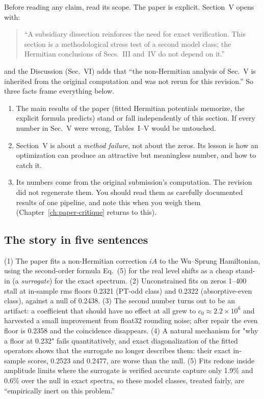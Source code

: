 Before reading any claim, read its scope. The paper is explicit. Section~V opens with:

\begin{quote}
``A subsidiary dissection reinforces the need for exact verification. This section is a methodological stress test of a second model class; the Hermitian conclusions of Secs.~III and~IV do not depend on it.''
\end{quote}

and the Discussion (Sec.~VI) adds that ``the non-Hermitian analysis of Sec.~V is inherited from the original computation and was not rerun for this revision.'' So three facts frame everything below.

\begin{enumerate}
\item The main results of the paper (fitted Hermitian potentials memorize, the explicit formula predicts) stand or fall independently of this section. If every number in Sec.~V were wrong, Tables~I--V would be untouched.
\item Section~V is about a \emph{method failure}, not about the zeros. Its lesson is how an optimization can produce an attractive but meaningless number, and how to catch it.
\item Its numbers come from the original submission's computation. The revision did not regenerate them. You should read them as carefully documented results of one pipeline, and note this when you weigh them (Chapter~\ref{ch:paper-critique} returns to this).
\end{enumerate}

\subsection{The story in five sentences}

(1) The paper fits a non-Hermitian correction $iA$ to the Wu--Sprung Hamiltonian, using the second-order formula Eq.~(5) for the real level shifts as a cheap stand-in (a \emph{surrogate}) for the exact spectrum. (2) Unconstrained fits on zeros 1--400 stall at in-sample rms floors 0.2321 (PT-odd class) and 0.2322 (absorptive-even class), against a null of 0.2438. (3) The second number turns out to be an artifact: a coefficient that should have no effect at all grew to $c_0\approx2.2\times10^6$ and harvested a small improvement from float32 rounding noise; after repair the even floor is 0.2358 and the coincidence disappears. (4) A natural mechanism for "why a floor at 0.232" fails quantitatively, and exact diagonalization of the fitted operators shows that the surrogate no longer describes them: their exact in-sample scores, 0.2523 and 0.2477, are worse than the null. (5) Fits redone inside amplitude limits where the surrogate is verified accurate capture only 1.9\% and 0.6\% over the null in exact spectra, so these model classes, treated fairly, are ``empirically inert on this problem.''

